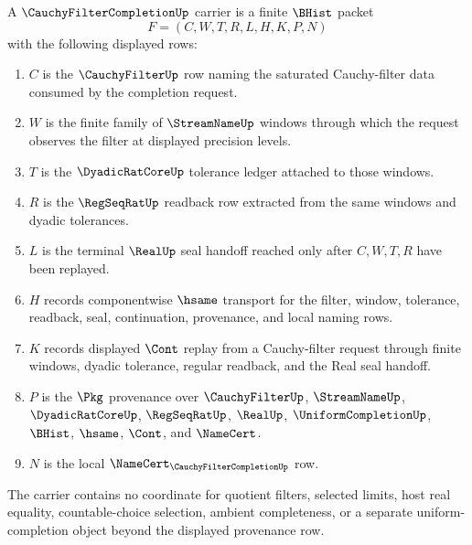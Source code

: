\begin{definition}
\label{def:cauchy-filter-completion-carrier}
A $\CauchyFilterCompletionUp$ carrier is a finite $\BHist$ packet
$$
F=(C,W,T,R,L,H,K,P,N)
$$
with the following displayed rows:
\begin{enumerate}
\item $C$ is the $\CauchyFilterUp$ row naming the saturated Cauchy-filter data consumed by the completion request.
\item $W$ is the finite family of $\StreamNameUp$ windows through which the request observes the filter at displayed precision levels.
\item $T$ is the $\DyadicRatCoreUp$ tolerance ledger attached to those windows.
\item $R$ is the $\RegSeqRatUp$ readback row extracted from the same windows and dyadic tolerances.
\item $L$ is the terminal $\RealUp$ seal handoff reached only after $C,W,T,R$ have been replayed.
\item $H$ records componentwise $\hsame$ transport for the filter, window, tolerance, readback, seal, continuation, provenance, and local naming rows.
\item $K$ records displayed $\Cont$ replay from a Cauchy-filter request through finite windows, dyadic tolerance, regular readback, and the Real seal handoff.
\item $P$ is the $\Pkg$ provenance over $\CauchyFilterUp$, $\StreamNameUp$, $\DyadicRatCoreUp$, $\RegSeqRatUp$, $\RealUp$, $\UniformCompletionUp$, $\BHist$, $\hsame$, $\Cont$, and $\NameCert$.
\item $N$ is the local $\NameCert_{\CauchyFilterCompletionUp}$ row.
\end{enumerate}
The carrier contains no coordinate for quotient filters, selected limits, host real equality, countable-choice selection, ambient completeness, or a separate uniform-completion object beyond the displayed provenance row.
\end{definition}

